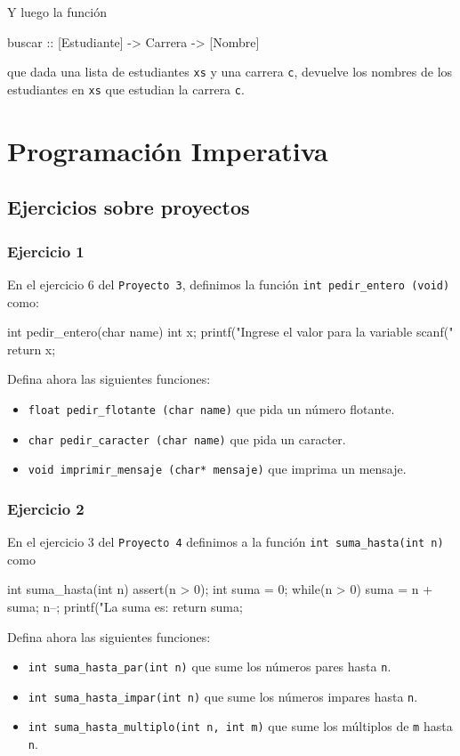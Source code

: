 \documentclass{article}
\begin{document}
Y luego la función
\begin{haskell}
    buscar :: [Estudiante] -> Carrera -> [Nombre]
\end{haskell}
que dada una lista de estudiantes \texttt{xs} y una carrera \texttt{c}, devuelve los nombres de los estudiantes en \texttt{xs} que estudian la carrera \texttt{c}.

\section{Programación Imperativa}

\subsection{Ejercicios sobre proyectos}

\subsubsection{Ejercicio 1}
En el ejercicio 6 del \texttt{Proyecto 3}, definimos la función \texttt{int pedir\_entero (void)} como:
\begin{c_code}
int pedir_entero(char name){
    int x;
    printf("Ingrese el valor para la variable %
    scanf("%
    return x;
}
\end{c_code}
Defina ahora las siguientes funciones:
\begin{itemize}
    \item \texttt{float pedir\_flotante (char name)} que pida un número flotante.
    \item \texttt{char pedir\_caracter (char name)} que pida un caracter.
    \item \texttt{void imprimir\_mensaje (char* mensaje)} que imprima un mensaje.
\end{itemize}

\subsubsection{Ejercicio 2}
En el ejercicio 3 del \texttt{Proyecto 4} definimos a la función \texttt{int suma\_hasta(int n)} como
\begin{c_code}
int suma_hasta(int n){
    assert(n > 0);
    int suma = 0;
    while(n > 0){
        suma = n + suma;
        n--;
    }
    printf("La suma es: %
    return suma;
}
\end{c_code}
Defina ahora las siguientes funciones:
\begin{itemize}
    \item \texttt{int suma\_hasta\_par(int n)} que sume los números pares hasta \texttt{n}.
    \item \texttt{int suma\_hasta\_impar(int n)} que sume los números impares hasta \texttt{n}.
    \item \texttt{int suma\_hasta\_multiplo(int n, int m)} que sume los múltiplos de \texttt{m} hasta \texttt{n}.
\end{itemize}
\end{document}
